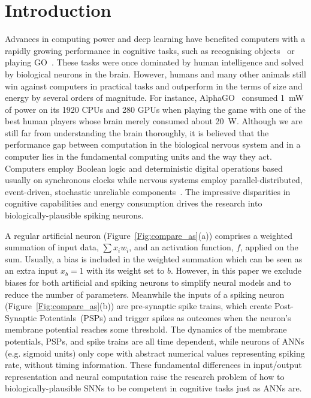\documentclass{article}
\begin{document}
\section{Introduction}
Advances in computing power and deep learning have benefited computers with a rapidly growing performance in cognitive tasks, such as recognising objects~\cite{deng2009imagenet} or playing GO~\cite{silver2016mastering}. 
These tasks were once dominated by human intelligence and solved by biological neurons in the brain.
However, humans and many other animals still win against computers in practical tasks and outperform in the terms of size and energy by several orders of magnitude.
For instance, AlphaGO~\cite{silver2016mastering} consumed 1~mW of power on its 1920 CPUs and 280 GPUs when playing the game with one of the best human players whose brain merely consumed about 20~W.
Although we are still far from understanding the brain thoroughly, it is believed that the performance gap between computation in the biological nervous system and in a computer lies in the fundamental computing units and the way they act.
Computers employ Boolean logic and deterministic digital operations based usually on synchronous clocks while nervous systems employ parallel-distributed, event-driven, stochastic unreliable components~\cite{indiveri2009artificial}.
The impressive disparities in cognitive capabilities and energy consumption drives the research into biologically-plausible spiking neurons.

A regular artificial neuron (Figure~\ref{Fig:compare_as}(a)) comprises a weighted summation of input data, $\sum x_i w_i$, and an activation function, $f$, applied on the sum.
Usually, a bias is included in the weighted summation which can be seen as an extra input $x_b = 1$ with its weight set to $b$.
However, in this paper we exclude biases for both artificial and spiking neurons to simplify neural models and to reduce the number of parameters.
Meanwhile the inputs of a spiking neuron (Figure~\ref{Fig:compare_as}(b)) are pre-synaptic spike trains, which create Post-Synaptic Potentials~(PSPs) and trigger spikes as outcomes when the neuron's membrane potential reaches some threshold.
The dynamics of the membrane potentials, PSPs, and spike trains are all time dependent, while neurons of ANNs (e.g. sigmoid units) only cope with abstract numerical values representing spiking rate, without timing information.
These fundamental differences in input/output representation and neural computation raise the research problem of how to biologically-plausible SNNs to be competent in cognitive tasks just as ANNs are.
\end{document}

